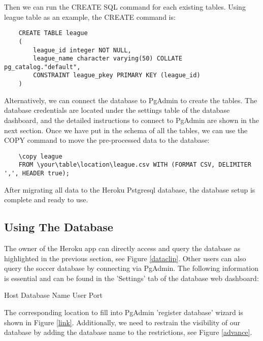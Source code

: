 Then we can run the CREATE SQL command for each existing tables. Using league table as an example, the CREATE command is:
\begin{verbatim}
    CREATE TABLE league
    (
        league_id integer NOT NULL,
        league_name character varying(50) COLLATE pg_catalog."default",
        CONSTRAINT league_pkey PRIMARY KEY (league_id)
    )
\end{verbatim}
Alternatively, we can connect the database to PgAdmin to create the tables. The database credentials are located under the settings table of the database dashboard, and the detailed instructions to connect to PgAdmin are shown in the next section. 
Once we have put in the schema of all the tables, we can use the COPY command to move the pre-processed data to the database:
\begin{verbatim}
    \copy league 
    FROM \your\table\location\league.csv WITH (FORMAT CSV, DELIMITER ',', HEADER true);
\end{verbatim}
After migrating all data to the Heroku Pstgresql database, the database setup is complete and ready to use.
\subsection{Using The Database}
The owner of the Heroku app can directly access and query the database as highlighted in the previous section, see Figure \ref{dataclip}. Other users can also query the soccer database by connecting via PgAdmin. The following information is essential and can be found in the 'Settings' tab of the database web dashboard:
\begin{itemize}
    Host
    Database Name
    User
    Port
\end{itemize}
The corresponding location to fill into PgAdmin 'register database' wizard is shown in Figure \ref{link}. Additionally, we need to restrain the visibility of our database by adding the database name to the restrictions, see Figure \ref{advance}.
